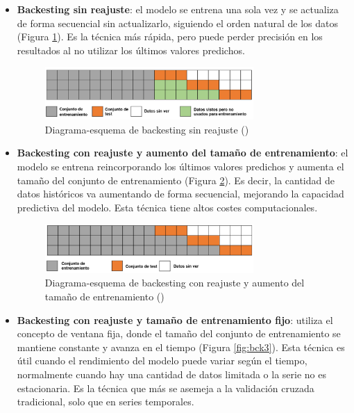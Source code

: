 \documentclass[12pt,a4paper]{report}
\begin{document}
\begin{itemize}
    \item \textbf{Backesting sin reajuste}: el modelo se entrena una sola vez y se actualiza de forma secuencial sin actualizarlo, siguiendo el orden natural de los datos (Figura \ref{fig:bck1}). Es la técnica más rápida, pero puede perder precisión en los resultados al no utilizar los últimos valores predichos.

    \begin{figure}[H]
    \centering
    \includegraphics[width=0.75\textwidth]{Images/tfm-2.11.png}
    \caption{Diagrama-esquema de backesting sin reajuste (\cite{skforecast})}
    \label{fig:bck1}
    \end{figure}

    \item \textbf{Backesting con reajuste y aumento del tamaño de entrenamiento}: el modelo se entrena reincorporando los últimos valores predichos y aumenta el tamaño del conjunto de entrenamiento (Figura \ref{fig:bck2}). Es decir, la cantidad de datos históricos va aumentando de forma secuencial, mejorando la capacidad predictiva del modelo. Esta técnica tiene altos costes computacionales.

    \begin{figure}[H]
    \centering
    \includegraphics[width=0.75\textwidth]{Images/tfm-2.12.png}
    \caption{Diagrama-esquema de backesting con reajuste y aumento del tamaño de entrenamiento (\cite{skforecast})}
    \label{fig:bck2}
    \end{figure}
    
    \item \textbf{Backesting con reajuste y tamaño de entrenamiento fijo}: utiliza el concepto de ventana fija, donde el tamaño del conjunto de entrenamiento se mantiene constante y avanza en el tiempo (Figura \ref{fig:bck3}). Esta técnica es útil cuando el rendimiento del modelo puede variar según el tiempo, normalmente cuando hay una cantidad de datos limitada o la serie no es estacionaria. Es la técnica que más se asemeja a la validación cruzada tradicional, solo que en series temporales. 


\end{itemize}
\end{document}
